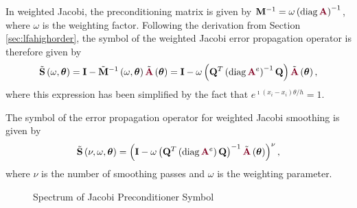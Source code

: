 In weighted Jacobi, the preconditioning matrix is given by $\mathbf{M}^{-1} = \omega \left( \diag {\color{burgundy}\mathbf{A}} \right)^{-1}$, where $\omega$ is the weighting factor.
Following the derivation from Section \ref{sec:lfahighorder}, the symbol of the weighted Jacobi error propagation operator is therefore given by
\begin{equation}
\tilde{\mathbf{S}} \left( \omega, \boldsymbol{\theta} \right) = \mathbf{I} - \tilde{\mathbf{M}}^{-1} \left( \omega, \boldsymbol{\theta} \right) \tilde{{\color{burgundy}\mathbf{A}}} \left( \boldsymbol{\theta} \right) = \mathbf{I} - \omega \left( \mathbf{Q}^T \left( \diag {\color{burgundy}\mathbf{A}}^e \right)^{-1} \mathbf{Q} \right) \tilde{{\color{burgundy}\mathbf{A}}} \left( \boldsymbol{\theta} \right),
\end{equation}
where this expression has been simplified by the fact that $e^{\imath \left( x_i - x_i \right) \theta / h} = 1$.

\begin{definition}
The symbol of the error propagation operator for weighted Jacobi smoothing is given by
\begin{equation}
\tilde{\mathbf{S}} \left( \nu, \omega, \boldsymbol{\theta} \right) = \left( \mathbf{I} - \omega \left( \mathbf{Q}^T \left( \diag {\color{burgundy}\mathbf{A}}^e \right) \mathbf{Q} \right)^{-1} \tilde{{\color{burgundy}\mathbf{A}}} \left( \boldsymbol{\theta} \right) \right)^\nu,
\end{equation}
where $\nu$ is the number of smoothing passes and $\omega$ is the weighting parameter.
\label{def:jacobi_symbol}
\end{definition}

\begin{figure}[!ht]
  \centering
  \hfill
  \caption{Spectrum of Jacobi Preconditioner Symbol}
\end{figure}

